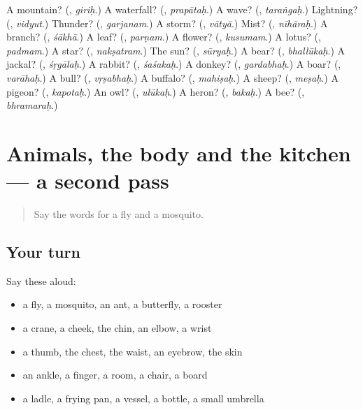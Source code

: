 \begin{tcolorbox}[breakable,colback=teal!4,colframe=teal!35!black,title={Before you move on}]
A mountain? (\textbf{}, \emph{giriḥ}.) A waterfall? (\textbf{}, \emph{prapātaḥ}.) A wave? (\textbf{}, \emph{taraṅgaḥ}.) Lightning? (\textbf{}, \emph{vidyut}.) Thunder? (\textbf{}, \emph{garjanam}.) A storm? (\textbf{}, \emph{vātyā}.) Mist? (\textbf{}, \emph{nīhāraḥ}.) A branch? (\textbf{}, \emph{śākhā}.) A leaf? (\textbf{}, \emph{parṇam}.) A flower? (\textbf{}, \emph{kusumam}.) A lotus? (\textbf{}, \emph{padmam}.) A star? (\textbf{}, \emph{nakṣatram}.) The sun? (\textbf{}, \emph{sūryaḥ}.) A bear? (\textbf{}, \emph{bhallūkaḥ}.) A jackal? (\textbf{}, \emph{śṛgālaḥ}.) A rabbit? (\textbf{}, \emph{śaśakaḥ}.) A donkey? (\textbf{}, \emph{gardabhaḥ}.) A boar? (\textbf{}, \emph{varāhaḥ}.) A bull? (\textbf{}, \emph{vṛṣabhaḥ}.) A buffalo? (\textbf{}, \emph{mahiṣaḥ}.) A sheep? (\textbf{}, \emph{meṣaḥ}.) A pigeon? (\textbf{}, \emph{kapotaḥ}.) An owl? (\textbf{}, \emph{ulūkaḥ}.) A heron? (\textbf{}, \emph{bakaḥ}.) A bee? (\textbf{}, \emph{bhramaraḥ}.)
\end{tcolorbox}
\section[(dialogue)]{Animals, the body and the kitchen — a second pass}

\label{lesson:SA-R119-second-pass-animals-the-body-and-the-kitchen}



\begin{quote}
Say the words for a fly and a mosquito.
\end{quote}

\subsection*{Your turn}
Say these aloud:

\begin{itemize}
\raggedright
  \item a fly, a mosquito, an ant, a butterfly, a rooster
  \item a crane, a cheek, the chin, an elbow, a wrist
  \item a thumb, the chest, the waist, an eyebrow, the skin
  \item an ankle, a finger, a room, a chair, a board
  \item a ladle, a frying pan, a vessel, a bottle, a small umbrella
\end{itemize}

